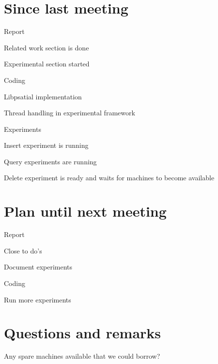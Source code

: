 \documentclass[a4paper,11pt,agenda,chair]{meetingmins}
\begin{document}
\maketitle

\section{Since last meeting}
\begin{items}
\item Report
	\begin{items}
		\item Related work section is done
		\item Experimental section started
	\end{items}
\item Coding
	\begin{items}
		\item Libpsatial implementation
		\item Thread handling in experimental framework
	\end{items}
\item Experiments
	\begin{items}
		\item Insert experiment is running
		\item Query experiments are running
		\item Delete experiment is ready and waits for machines to become available
	\end{items}
\end{items}

\section{Plan until next meeting}
\begin{items}
\item Report
	\begin{items}
		\item Close to do's
		\item Document experiments
	\end{items}
\item Coding
	\begin{items}
		\item Run more experiments
	\end{items}
\end{items}

\section{Questions and remarks}
\begin{items}
	\item Any spare machines available that we could borrow?
\end{items}
\end{document}
